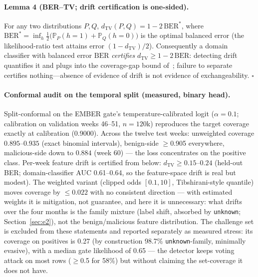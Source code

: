 \documentclass[sigconf,anonymous=false]{acmart}
\begin{document}
\paragraph{Lemma 4 (BER--TV; drift certification is one-sided).} For any two distributions $P, Q$, $d_{\mathrm{TV}}(P,Q) = 1 - 2\,\mathrm{BER}^{*}$, where $\mathrm{BER}^{*} = \inf_h \tfrac12\big(\mathbb{P}_P(h{=}1) + \mathbb{P}_Q(h{=}0)\big)$ is the optimal balanced error (the likelihood-ratio test attains error $(1-d_{\mathrm{TV}})/2$). Consequently a domain classifier with balanced error $\mathrm{BER}$ \emph{certifies} $d_{\mathrm{TV}} \ge 1 - 2\,\mathrm{BER}$: detecting drift quantifies it and plugs into the coverage-gap bound of~\cite{barber2023}; failure to separate certifies nothing---absence of evidence of drift is not evidence of exchangeability. \hfill$\square$

\paragraph{Conformal audit on the temporal split (measured, binary head).} Split-conformal on the EMBER gate's temperature-calibrated logit ($\alpha{=}0.1$; calibration on validation weeks 46--51, $n{=}120$k) reproduces the target coverage exactly at calibration (0.9000). Across the twelve test weeks: unweighted coverage $0.895$--$0.935$ (exact binomial intervals), benign-side $\ge$0.905 everywhere, malicious-side down to $0.884$ (week 60) --- the loss concentrates on the positive class. Per-week feature drift is certified from below: $d_{\mathrm{TV}} \ge 0.15$--$0.24$ (held-out BER; domain-classifier AUC 0.61--0.64, so the feature-space drift is real but modest). The weighted variant (clipped odds $[0.1,10]$, Tibshirani-style quantile) moves coverage by $\le 0.022$ with no consistent direction --- with estimated weights it is mitigation, not guarantee, and here it is unnecessary: what drifts over the four months is the family mixture (label shift, absorbed by \texttt{unknown}; Section~\ref{sec:e2}), not the benign/malicious feature distribution. The challenge set is excluded from these statements and reported separately as measured stress: its coverage on positives is 0.27 (by construction 98.7\% \texttt{unknown}-family, minimally evasive), with a median gate likelihood of 0.65 --- the detector keeps voting attack on most rows ($\ge$0.5 for 58\%) but without claiming the set-coverage it does not have.
\end{document}

